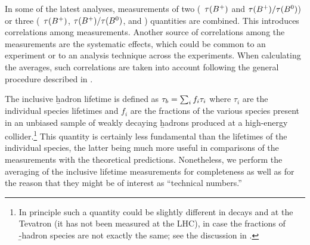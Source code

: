 In some of the latest analyses, measurements of two (\eg\ $\tau(B^+)$ and
$\tau(B^+)/\tau(B^0)$) or three (\eg\ $\tau(B^+)$,
$\tau(B^+)/\tau(B^0)$, and \dmd) quantities are combined.  This
introduces correlations among measurements.  Another source of
correlations among the measurements are the systematic effects, which
could be common to an experiment or to an analysis technique across the
experiments.  When calculating the averages, such correlations are taken
into account following the general procedure described in
.



The inclusive \b hadron lifetime is defined as $\tau_{b} = \sum_i f_i
\tau_i$ where $\tau_i$ are the individual species lifetimes and $f_i$ are
the fractions of the various species present in an unbiased sample of
weakly decaying \b hadrons produced at a high-energy
collider.\footnote{In principle such a quantity could be slightly
different in  decays and at the Tevatron (it has not been measured
at the LHC), in case the
fractions of \b-hadron species are not exactly the same; see the
discussion in .}  This quantity is certainly
less fundamental than the lifetimes of the individual species, the
latter being much more useful in comparisons of the measurements with
the theoretical predictions.  Nonetheless, we perform the averaging of
the inclusive lifetime measurements for completeness as well as for the
reason that they might be of interest as ``technical numbers.''

